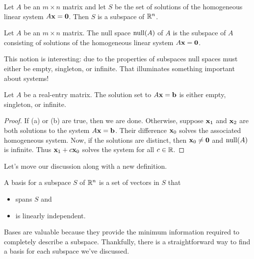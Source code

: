 \documentclass[../m073main.tex]{subfiles}
\begin{document}
\begin{theorem}
	Let $A$ be an $m\times n$ matrix and let $S$ be the set of solutions of the homogeneous linear system $A\mathbf{x} = \mathbf{0}$.
	Then $S$ is a subspace of $\mathbb{R}^n$.
\end{theorem}

\begin{definition}
	Let $A$ be an $m\times n$ matrix.
	The null space $\operatorname{null}(A)$ of $A$ is the subspace of $A$ consisting of solutions of the homogeneous linear system $A\mathbf{x} = \mathbf{0}$.
\end{definition}

This notion is interesting: due to the properties of subspaces null spaces must either be empty, singleton, or infinite.
That illuminates something important about systems!

\begin{theorem}
	Let $A$ be a real-entry matrix.
	The solution set to $A \mathbf{x} = \mathbf{b}$ is either empty, singleton, or infinite.
\end{theorem}

\begin{proof}
	If (a) or (b) are true, then we are done.
	Otherwise, suppose $\mathbf{x}_1$ and $\mathbf{x}_2$ are both solutions to the system $A \mathbf{x} = \mathbf{b}$.
	Their difference $\mathbf{x}_0$ solves the associated homogeneous system.
	Now, if the solutions are distinct, then $\mathbf{x}_0 \neq \mathbf{0}$ and $\operatorname{null}(A)$ is infinite.
	Thus $\mathbf{x}_1 + c \mathbf{x}_0$ solves the system for all $c \in \mathbb{R}$.
\end{proof}

Let's move our discussion along with a new definition.

\begin{definition}
	A basis for a subspace $S$ of $\mathbb{R}^n$ is a set of vectors in $S$ that
	\begin{itemize}
		\item spans $S$ and
		\item is linearly independent.
	\end{itemize}
\end{definition}

Bases are valuable because they provide the minimum information required to completely describe a subspace.
Thankfully, there is a straightforward way to find a basis for each subspace we've discussed.
\end{document}
